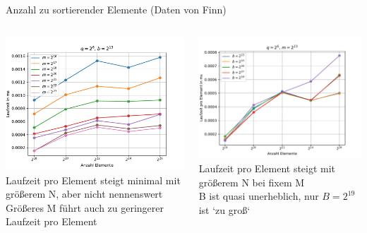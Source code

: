 \documentclass[ngerman,aspectratio=169,10pt]{beamer}
\begin{document}
\begin{frame}{Anzahl zu sortierender Elemente}
	\centering
	\vspace{-3px}
	(Daten von Finn)
	\vspace{2px}
	\begin{columns}
		\begin{column}{0.5\textwidth}
			\includegraphics[width=\textwidth]{Figure_4_per_element.pdf}
			Laufzeit pro Element steigt minimal mit größerem N, aber nicht nennenswert\\
			Größeres M führt auch zu geringerer Laufzeit pro Element
		\end{column}
		\begin{column}{0.5\textwidth}
			\includegraphics[width=\textwidth]{Figure_5_per_element.pdf}
			Laufzeit pro Element steigt mit größerem N bei fixem M\\
			B ist quasi unerheblich, nur $B=2^{19}$ ist `zu groß`
		\end{column}
	\end{columns}
\end{frame}
\end{document}
